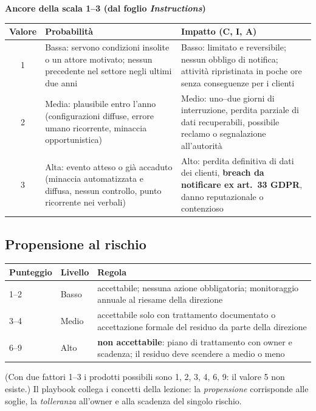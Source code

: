\begin{center}
\small
\textbf{Ancore della scala 1--3 (dal foglio \emph{Instructions})}\par\smallskip
\begin{tabularx}{\linewidth}{c X X}
\toprule
\textbf{Valore} & \textbf{Probabilità} & \textbf{Impatto (C, I, A)} \\ \midrule
1 & Bassa: servono condizioni insolite o un attore motivato; nessun precedente nel settore negli ultimi
  due anni & Basso: limitato e reversibile; nessun obbligo di notifica; attività ripristinata in poche ore
  senza conseguenze per i clienti \\
2 & Media: plausibile entro l'anno (configurazioni diffuse, errore umano ricorrente, minaccia
  opportunistica) & Medio: uno--due giorni di interruzione, perdita parziale di dati recuperabili,
  possibile reclamo o segnalazione all'autorità \\
3 & Alta: evento atteso o già accaduto (minaccia automatizzata e diffusa, nessun controllo, punto
  ricorrente nei verbali) & Alto: perdita definitiva di dati dei clienti, \textbf{breach da notificare ex
  art.~33 GDPR}, danno reputazionale o contenzioso \\ \bottomrule
\end{tabularx}
\end{center}

\subsection{Propensione al rischio}
\begin{center}
\small
\begin{tabularx}{\linewidth}{l l X}
\toprule
\textbf{Punteggio} & \textbf{Livello} & \textbf{Regola} \\ \midrule
1--2 & Basso & accettabile; nessuna azione obbligatoria; monitoraggio annuale al riesame della direzione \\
3--4 & Medio & accettabile solo con trattamento documentato o accettazione formale del residuo da parte
  della direzione \\
6--9 & Alto & \textbf{non accettabile}: piano di trattamento con owner e scadenza; il residuo deve scendere
  a medio o meno \\ \bottomrule
\end{tabularx}
\end{center}
\noindent (Con due fattori 1--3 i prodotti possibili sono 1, 2, 3, 4, 6, 9: il valore 5 non esiste.) Il
playbook collega i concetti della lezione: la \emph{propensione} corrisponde alle soglie, la
\emph{tolleranza} all'owner e alla scadenza del singolo rischio.

